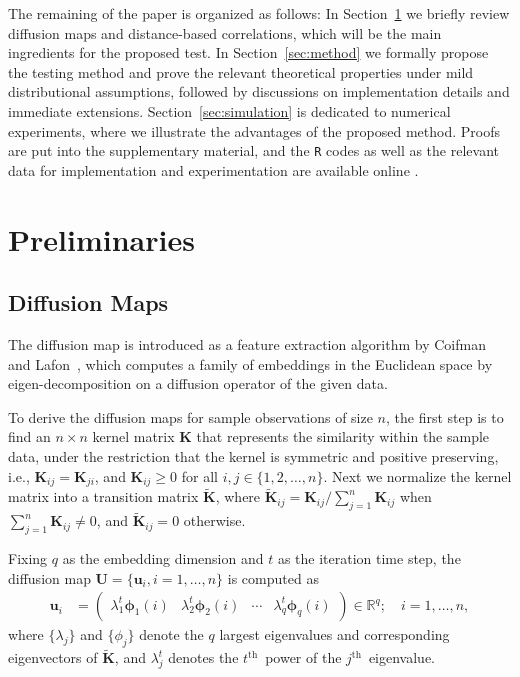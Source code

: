 \documentclass[11pt]{article}
\theoremstyle{definition}
\begin{document}
The remaining of the paper is organized as follows: In Section~\ref{sec:pre} we briefly review diffusion maps and distance-based correlations, which will be the main ingredients for the proposed test. In Section~\ref{sec:method} we formally propose the testing method and prove the relevant theoretical properties under mild distributional assumptions, followed by discussions on implementation details and immediate extensions. Section~\ref{sec:simulation} is dedicated to numerical experiments, where we illustrate the advantages of the proposed method. Proofs are put into the supplementary material, and the \texttt{R} codes as well as the relevant data for implementation and experimentation are available online \footnotemark{}.


\section{Preliminaries}
\label{sec:pre}
\subsection{Diffusion Maps}
\label{ssec:method2}

The diffusion map is introduced as a feature extraction algorithm by Coifman and Lafon~\cite{coifman2005geometric,coifman2006diffusion,lafon2006diffusion}, which computes a family of embeddings in the Euclidean space by eigen-decomposition on a diffusion operator of the given data. 

To derive the diffusion maps for sample observations of size $n$, the first step is to find an $n \times n$ kernel matrix $\mathbf{K}$ that represents the similarity within the sample data, under the restriction that the kernel is symmetric and positive preserving, i.e., $\mathbf{K}_{ij}=\mathbf{K}_{ji}$, and $\mathbf{K}_{ij} \geq 0$ for all $i,j \in \{1, 2, \ldots, n\}$. Next we normalize the kernel matrix into a transition matrix $\mathbf{\widetilde{K}}$, where $\mathbf{\widetilde{K}}_{ij} = \mathbf{K}_{ij} / \sum\limits_{j=1}^{n} \mathbf{K}_{ij}$ when $\sum\limits_{j=1}^{n} \mathbf{K}_{ij} \neq 0$, and $\mathbf{\widetilde{K}}_{ij}=0$ otherwise.

Fixing $q$ as the embedding dimension and $t$ as the iteration time step, the diffusion map $\mathbf{U}=\{\mathbf{u}_i, i=1,\ldots,n\}$ is computed as 
\begin{align}
\label{eq:U}
\mathbf{u}_i  &= \begin{pmatrix} \lambda^{t}_{1} \mathbf{\phi}_{1}(i) & \lambda^{t}_{2} \mathbf{\phi}_{2} (i)  & \cdots & \lambda^{t}_{q} \mathbf{\phi}_{q}(i) \end{pmatrix} \in \mathbb{R}^{q}; \quad i = 1, \ldots, n,
\end{align}
where $\{ \lambda_{j} \}$ and $\{ \phi_{j}  \}$ denote the $q$ largest eigenvalues and corresponding eigenvectors of $\mathbf{\widetilde{K}}$, and $\lambda^{t}_{j}$ denotes the $t^{\mbox{th}}$~power of the $j^{\mbox{th}}$~eigenvalue.
\end{document}
